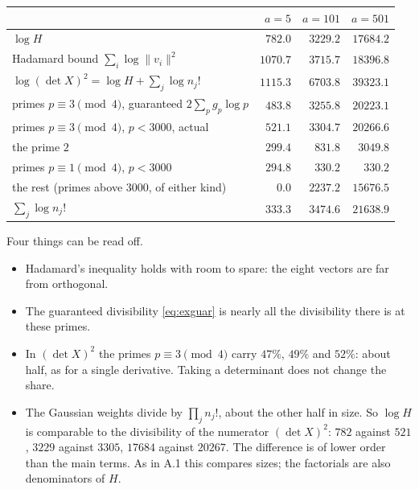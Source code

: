 \documentclass[11pt]{amsart}
\numberwithin{equation}{section}
\theoremstyle{definition}
\theoremstyle{remark}
\begin{document}
\begin{center}\small
\begin{tabular}{@{}lrrr@{}}
\toprule
 & $a=5$ & $a=101$ & $a=501$\\
\midrule
$\log H$ & $782.0$ & $3229.2$ & $17684.2$\\
Hadamard bound $\sum_i\log\|v_i\|^2$ & $1070.7$ & $3715.7$ & $18396.8$\\
\midrule
$\log(\det X)^2=\log H+\sum_j\log n_j!$ & $1115.3$ & $6703.8$ & $39323.1$\\
\quad primes $p\equiv3\pmod4$, guaranteed $2\sum_pg_p\log p$ & $483.8$ & $3255.8$ & $20223.1$\\
\quad primes $p\equiv3\pmod4$, $p<3000$, actual & $521.1$ & $3304.7$ & $20266.6$\\
\quad the prime $2$ & $299.4$ & $831.8$ & $3049.8$\\
\quad primes $p\equiv1\pmod4$, $p<3000$ & $294.8$ & $330.2$ & $330.2$\\
\quad the rest (primes above $3000$, of either kind) & $0.0$ & $2237.2$ & $15676.5$\\
$\sum_j\log n_j!$ & $333.3$ & $3474.6$ & $21638.9$\\
\bottomrule
\end{tabular}
\end{center}
Four things can be read off.
\begin{itemize}[leftmargin=2em]
\item Hadamard's inequality holds with room to spare: the eight vectors are far from orthogonal.
\item The guaranteed divisibility \eqref{eq:exguar} is nearly all the divisibility there is at these primes.
\item In $(\det X)^2$ the primes $p\equiv3\pmod4$ carry $47\%$, $49\%$ and $52\%$: about half, as for a single derivative. Taking a determinant does not change the share.
\item The Gaussian weights divide by $\prod_jn_j!$, about the other half in size. So $\log H$ is comparable to the divisibility of the numerator $(\det X)^2$: $782$ against $521$, $3229$ against $3305$, $17684$ against $20267$. The difference is of lower order than the main terms. As in A.1 this compares sizes; the factorials are also denominators of $H$.
\end{itemize}
\end{document}
